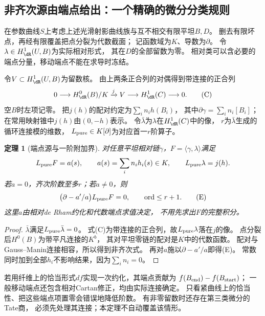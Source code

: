 \documentclass[11pt,a4paper]{ctexart}
\theoremstyle{cnplain}\newtheorem{theorem}{定理}[section]
\theoremstyle{definition}\newtheorem{definition}[theorem]{定义}
\theoremstyle{remark}\newtheorem{remark}[theorem]{注}
\begin{document}
\subsection{非齐次源由端点给出：一个精确的微分分类规则}
在参数曲线$S$上考虑上述光滑射影曲线族与互不相交有限平坦$B,D$。
删去有限坏点，再经有限覆盖把点分裂为代数截面；
记函数域为$K$、导数为$\partial$。
令$\lambda\in H^1_{\dR}(U,B)$为实际相对形式，
其在$D$的全部留数为零。
相对类可以含必要的端点分量，移动端点不能在求导时冻结。

令$V\subset H^1_{\dR}(U,B)$为留数核。
由上两条正合列的对偶得到带连接的正合列
\[
 0\longrightarrow H^0_{\dR}(B)/K
 \xrightarrow{j}V\longrightarrow H^1_{\dR}(C)\longrightarrow0.
 \tag{C}
\]
空$B$时左项记零。
把$j(h)$的配对约定为$\sum_i n_i h(B_i)$，
其中$\partial\gamma=\sum_i n_i[B_i]$；在常用映射锥中$j(h)$由$(0,-h)$表示。
令$\bar\lambda$为$\lambda$在$H^1_{\dR}(C)$中的像，
$r$为$\bar\lambda$生成的循环连接模的维数，
$L_{\rm pure}\in K[\partial]$为对应首一$r$阶算子。

\begin{theorem}[端点源与一阶附加界]\label{thm:endpoint}
对任意平坦相对链$\gamma$，$F=\langle\gamma,\lambda\rangle$满足
\[
 L_{\rm pure}F=a(s),\qquad
 a(s)=\sum_i n_i h_i(s)\in K,\qquad
 L_{\rm pure}\lambda=j(h).
\]
若$a=0$，齐次阶数至多$r$；若$a\ne0$，则
\[
 \bigl(\partial-a'/a\bigr)L_{\rm pure}F=0,
 \qquad \operatorname{ord}\le r+1.
 \tag{E}
\]
这里$a$由相对de Rham约化和代数端点求值决定，
不用先求出$F$的完整积分。
\end{theorem}
\begin{proof}
$\bar\lambda$满足$L_{\rm pure}\bar\lambda=0$。
式(C)为带连接的正合列，故$L_{\rm pure}\lambda$落在$j$的像。
点分裂后$H^0(B)$为带平凡连接的$K^b$，
其对平坦零链的配对是$K$中的代数函数。
配对与Gauss--Manin连接相容，所以得到非齐次式。
再对$a$施以$\partial-a'/a$即得(E)。
常数同时加到全部$h_i$不影响结果，因为$\sum_i n_i=0$。
\end{proof}
若用纤维上的恰当形式$df$实现一次约化，其端点贡献为
$f(B_{\rm end})-f(B_{\rm start})$；
一般移动端点还包含相对Cartan修正，均由实际连接确定。
只看紧曲线上的恰当性、把这些端点项置零会错误地降低阶数。
有非零留数时还存在第三类微分的Tate商，
必须先处理其连接；本定理不自动覆盖该情形。
\end{document}
